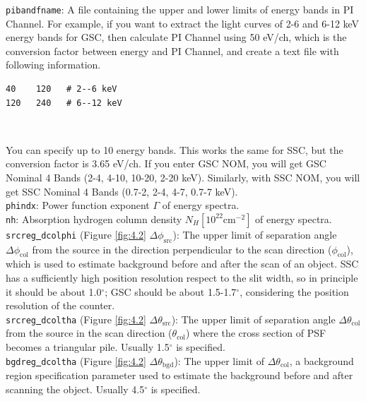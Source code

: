 \documentclass[10pt]{report}
\renewcommand{\_}{\textscale{.5}{\textbf{\textunderscore}}}
\begin{document}
\noindent \texttt{pibandfname}: A file containing the upper and lower limits of energy bands in PI Channel. For example, if you want to extract the light curves of 2-6 and 6-12 keV energy bands for GSC, then calculate PI Channel using 50 eV/ch, which is the conversion factor between energy and PI Channel, and create a text file with following information.

\begin{lstlisting}[columns=fixed, basicstyle=\ttfamily\small]
40    120   # 2--6 keV
120   240   # 6--12 keV
\end{lstlisting}

\

\noindent You can specify up to 10 energy bands. This works the same for SSC, but the conversion factor is 3.65 eV/ch. If you enter GSC NOM, you will get GSC Nominal 4 Bands (2-4, 4-10, 10-20, 2-20 keV). Similarly, with SSC NOM, you will get SSC Nominal 4 Bands (0.7-2, 2-4, 4-7, 0.7-7 keV). \\

\noindent \texttt{phindx}: Power function exponent $\Gamma$ of energy spectra.\\

\noindent \texttt{nh}: Absorption hydrogen column density $N_H [10^{22} \text{cm}^{−2}]$ of energy spectra. \\

\noindent \texttt{srcreg\underline{ }dcolphi} (Figure \ref{fig:4.2} $\Delta\phi_{\text{src}}$): The upper limit of separation angle $\Delta\phi_{\text{col}}$ from the source in the direction perpendicular to the scan direction ($\phi_{\text{col}}$), which is used to estimate background before and after the scan of an object. SSC has a sufficiently high position resolution respect to the slit width, so in principle it should be about 1.0$^{\circ}$; GSC should be about 1.5-1.7$^{\circ}$, considering the position resolution of the counter.\\

\noindent \texttt{srcreg\underline{ }dcoltha} (Figure \ref{fig:4.2} $\Delta\theta_{\text{src}}$): The upper limit of separation angle $\Delta\theta_{\text{col}}$ from the source in the scan direction ($\theta_{\text{col}}$) where the cross section of PSF becomes a triangular pile. Usually 1.5$^{\circ}$ is specified. \\

\noindent \texttt{bgdreg\underline{ }dcoltha} (Figure \ref{fig:4.2} $\Delta\theta_{\text{bgd}}$): The upper limit of $\Delta\theta_{\text{col}}$, a background region specification parameter used to estimate the background before and after scanning the object. Usually 4.5$^{\circ}$ is specified. \\
\end{document}
